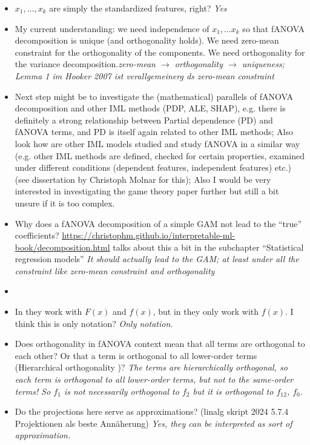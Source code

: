 \begin{itemize}
    \item $x_1, \dots, x_k$ are simply the standardized features, right? \textit{Yes}
    \item {\color{orange}My current understanding: we need independence of $x_1, \dots x_k$ so that fANOVA decomposition is unique (and orthogonality holds). We need zero-mean constraint for the orthogonality of the components. We need orthogonality for the variance decomposition.}\textit{zero-mean $\rightarrow$ orthogonality $\rightarrow$ uniqueness; Lemma 1 im Hooker 2007 ist verallgemeinerg ds zero-mean constraint}
    \item Next step might be to investigate the (mathematical) parallels of fANOVA decomposition and other IML methods (PDP, ALE, SHAP), e.g. there is definitely a strong relationship between Partial dependence (PD) and fANOVA terms, and PD is itself again related to other IML methods; Also look how are other IML models studied and study fANOVA in a similar way (e.g. other IML methods are defined, checked for certain properties, examined under different conditions (dependent features, independent features) etc.) (see dissertation by Christoph Molnar for this); Also I would be very interested in investigating the game theory paper further \citep{fumagalli2025} but still a bit unsure if it is too complex.
    \item Why does a fANOVA decomposition of a simple GAM not lead to the ``true'' coefficients? \href{https://christophm.github.io/interpretable-ml-book/decomposition.html}{https://christophm.github.io/interpretable-ml-book/decomposition.html} talks about this a bit in the subchapter ``Statistical regression models'' \textit{It should actually lead to the GAM; at least under all the constraint like zero-mean constraint and orthogonality}
    \item 
    \item In \cite{hooker2004} they work with $F(x)$ and $f(x)$, but in \cite{sobol2001} they only work with $f(x)$. I think this is only notation? \textit{Only notation.}
    \item Does orthogonality in fANOVA context mean that all terms are orthogonal to each other? Or that a term is orthogonal to all lower-order terms (\ldq Hierarchical orthogonality \rdq)? \textit{The terms are hierarchically orthogonal, so each term is orthogonal to all lower-order terms, but not to the same-order terms! So $f_1$ is not necessarily orthogonal to $f_2$ but it is orthogonal to $f_{12}$, $f_{0}$.} 
    \item Do the projections here serve as approximations? (linalg skript 2024 5.7.4 Projektionen als beste Annäherung) \textit{Yes, they can be interpreted as sort of approximation.}

\end{itemize}

